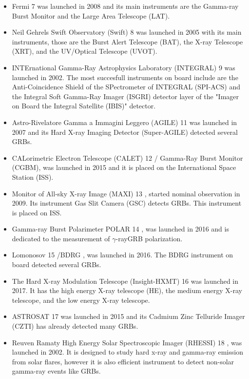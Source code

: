 \documentclass[12pt, a4paper,titlepage]{article}
\numberwithin{equation}{section}
\numberwithin{figure}{section}
\begin{document}
\begin{itemize}
\item Fermi 7 \cite{grb28} was launched in 2008 and its main instruments are the Gamma-ray Burst Monitor and the Large Area Telescope (LAT). 
\item Neil Gehrels Swift Observatory (Swift) 8 \cite{grb31} was launched in 2005 with its main instruments, those are the Burst Alert Telescope (BAT),  the X-ray Telescope (XRT), and the UV/Optical Telescope (UVOT).
\item INTErnational Gamma-Ray Astrophysics Laboratory (INTEGRAL) 9 \cite{grb32} was launched in 2002. The most succesfull instruments on board include are the Anti-Coincidence Shield of the SPectrometer of INTEGRAL (SPI-ACS) and the Integral Soft Gamma-Ray Imager (ISGRI) detector layer of the "Imager on Board the Integral Satellite (IBIS)" detector.
\item Astro-Rivelatore Gamma a Immagini Leggero (AGILE) 11 \cite{grb34} was launched in 2007 and its Hard X-ray Imaging Detector (Super-AGILE) detected several GRBs.
\item CALorimetric Electron Telescope (CALET) 12 \cite{grb35} / Gamma-Ray Burst Monitor (CGBM), was launched in 2015 and it is placed on the International Space Station (ISS).
\item Monitor of All-sky X-ray Image (MAXI) 13 \cite{grb36}, started nominal observation in 2009. Its instrument Gas Slit Camera (GSC) detects GRBs. This instrument is placed on ISS.
\item Gamma-ray Burst Polarimeter POLAR 14 \cite{grb37}, was launched in 2016 and is dedicated to the measurement of $\gamma$-rayGRB polarization.
\item Lomonosov 15 /BDRG \cite{grb38}, was launched in 2016. The BDRG instrument on board detected several GRBs.
\item The Hard X-ray Modulation Telescope (Insight-HXMT) 16 \cite{grb39} was launched in 2017. It has the high energy X-ray telescope (HE), the medium energy X-ray telescope, and the low energy X-ray telescope.
\item ASTROSAT 17 \cite{grb40} was launched in 2015 and its Cadmium Zinc Telluride Imager (CZTI) has already detected many GRBs.
\item Reuven Ramaty High Energy Solar Spectroscopic Imager (RHESSI) 18 \cite{grb41}, was launched in 2002. It is designed to study hard x-ray and gamma-ray emission from solar flares, however it is also efficient instrument to detect non-solar gamma-ray events like GRBs.
\end{itemize}
\end{document}
